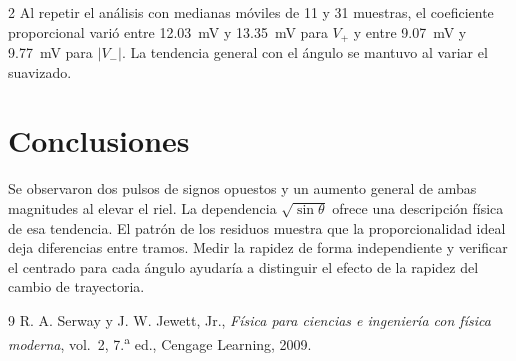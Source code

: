 \documentclass[10pt,letterpaper]{article}
\begin{document}
\begin{multicols}{2}
Al repetir el análisis con medianas móviles de 11 y 31 muestras, el coeficiente proporcional varió entre \qty{12.03}{\milli\volt} y \qty{13.35}{\milli\volt} para $V_+$ y entre \qty{9.07}{\milli\volt} y \qty{9.77}{\milli\volt} para $\lvert V_-\rvert$. La tendencia general con el ángulo se mantuvo al variar el suavizado.

\section{Conclusiones}
Se observaron dos pulsos de signos opuestos y un aumento general de ambas magnitudes al elevar el riel. La dependencia $\sqrt{\sin\theta}$ ofrece una descripción física de esa tendencia. El patrón de los residuos muestra que la proporcionalidad ideal deja diferencias entre tramos. Medir la rapidez de forma independiente y verificar el centrado para cada ángulo ayudaría a distinguir el efecto de la rapidez del cambio de trayectoria.

\begin{thebibliography}{9}
 R. A. Serway y J. W. Jewett, Jr., \emph{Física para ciencias e ingeniería con física moderna}, vol.~2, 7.\textsuperscript{a} ed., Cengage Learning, 2009.
\end{thebibliography}
\end{multicols}
\end{document}
